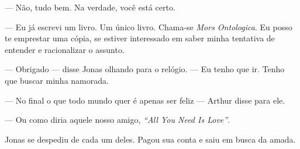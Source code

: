 --- Não, tudo bem. Na verdade, você está certo.

--- Eu já escrevi um livro. Um único livro. Chama-se \emph{Mors Ontologica}. Eu posso te emprestar uma cópia, se estiver interessado em saber minha tentativa de entender e racionalizar o assunto.

--- Obrigado --- disse Jonas\mudanca{,} olhando para o relógio. --- Eu tenho que ir. Tenho que buscar minha namorada.

--- No final\mudanca{,} o que todo mundo quer é apenas ser feliz --- Arthur disse para ele.

--- Ou como diria aquele nosso amigo, \foreignlanguage{english}{\emph{``All You Need Is Love''}}.

Jonas se despediu de cada um deles. Pagou sua conta e saiu em busca da amada.
